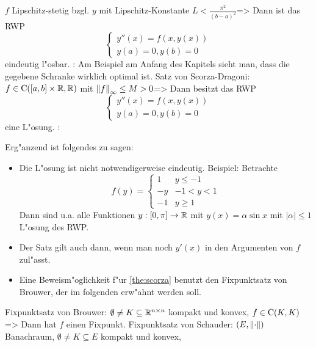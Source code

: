   $f$ Lipschitz-stetig bzgl. $y$ mit Lipschitz-Konstante $L<\frac{\pi^2}{(b-a)^2}$=>{
  Dann ist das RWP
  \[\left\{\begin{array}{l}
      y''(x)=f(x,y(x))\\
      y(a)=0,y(b)=0
      \end{array}\right.
    \]
  eindeutig l"osbar.
  }
\remark:{
  Am Beispiel am Anfang des Kapitels sieht man, dass die gegebene Schranke
  wirklich optimal ist.
  }
\theorem Satz von Scorza-Dragoni:
  $f\in{\rm C}([a,b]\times\mathbb R,\mathbb R)$ mit ${\left\| f\right\|}_\infty\leq M>0$=>{
  \label{the:scorza}
  Dann besitzt das RWP
  \[\left\{\begin{array}{l}
      y''(x)=f(x,y(x))\\
      y(a)=0,y(b)=0
      \end{array}\right.
    \]
  eine L"osung.
  }
\remark:{
  Erg"anzend ist folgendes zu sagen:
  \begin{itemize}
    \item Die L"osung ist nicht notwendigerweise eindeutig. Beispiel:
      Betrachte
      \[f(y)=\begin{cases}
        1 & y\leq -1\\
        -y & -1<y<1\\
        -1 & y\geq 1
        \end{cases}
        \]
      Dann sind u.a. alle Funktionen $y:[0,\pi]\to\mathbb R$ mit 
      $y(x)=\alpha\sin x$ mit $|\alpha|\leq 1$ L"osung des RWP.
    \item Der Satz gilt auch dann, wenn man noch $y'(x)$ in den
      Argumenten von $f$ zul"asst.
    \item Eine Beweism"oglichkeit f"ur \ref{the:scorza} benutzt
      den Fixpunktsatz von Brouwer, der im folgenden erw"ahnt werden soll.
    \end{itemize}
  }
\lessertheorem Fixpunktsatz von Brouwer:
  $\emptyset\neq K\subseteq\mathbb R^{n\times n}$ kompakt und konvex,
  $f\in{\rm C}(K,K)$=>{
  Dann hat $f$ einen Fixpunkt.
  }
\lessertheorem Fixpunktsatz von Schauder:
  $(E,{\left\| \cdot\right\|})$ Banachraum,
  $\emptyset\neq K\subseteq E$ kompakt und konvex,
